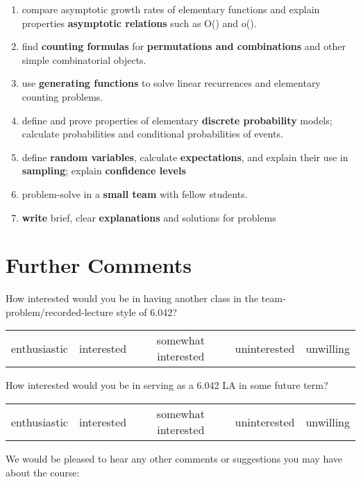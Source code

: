 \documentclass[handout]{mcs}
\begin{document}
\begin{enumerate}
\item \label{asymptotics} compare asymptotic growth rates of
  elementary functions and explain properties \textbf{asymptotic
    relations} such as O() and o().

\item \label{counting} find \textbf{counting formulas} for
  \textbf{permutations and combinations} and other simple
  combinatorial objects. \hfill \brule{0.5in}

\item\label{generating functions} use \textbf{generating functions} to solve
  linear recurrences and elementary counting problems.
  \hfill \brule{0.5in}

\item \label{probability} define and prove properties of elementary
  \textbf{discrete probability} models; calculate probabilities and
  conditional probabilities of events.  \hfill \brule{0.5in}

\item \label{random_variables} define \textbf{random variables},
  calculate \textbf{expectations}, and explain their use
  in \textbf{sampling}; explain \textbf{confidence levels} \hfill
  \brule{0.5in}

\item \label{student teams} problem-solve in a \textbf{small team} with
fellow students.  \hfill \brule{0.5in}

\item \label{writing} \textbf{write} brief, clear
  \textbf{explanations} and solutions for problems \hfill
  \brule{0.5in}
\end{enumerate}

\newpage
\section*{Further Comments}

How interested would you be in having another class in the
team-problem/recorded-lecture style of 6.042?
\begin{center}
\begin{tabular}{ccccc}
enthusiastic &  interested &  somewhat interested  &  uninterested &  unwilling
\end{tabular}
\end{center}

\noindent How interested would you be in serving as a 6.042 LA in some future
term?
\begin{center}
\begin{tabular}{ccccc}
enthusiastic &  interested &  somewhat interested  &  uninterested &  unwilling
\end{tabular}
\end{center}

\vspace{0.5in}
We would be pleased to hear any other comments or suggestions you may have
about the course:

\textbox{\hspace{7in}
\vspace{6in}}
\end{document}
